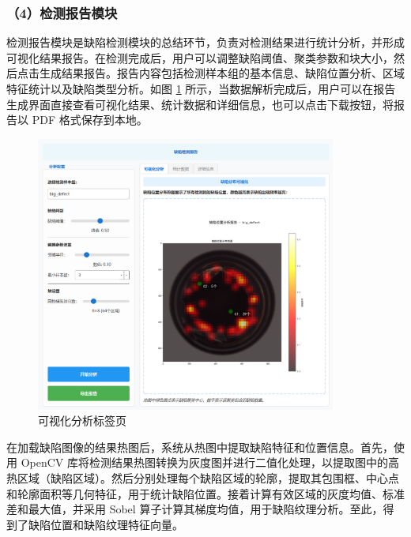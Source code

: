 \documentclass[
  ]{njuthesis}
\begin{document}
\subsubsection{（4）检测报告模块}

检测报告模块是缺陷检测模块的总结环节，负责对检测结果进行统计分析，并形成可视化结果报告。在检测完成后，用户可以调整缺陷阈值、聚类参数和块大小，然后点击生成结果报告。报告内容包括检测样本组的基本信息、缺陷位置分析、区域特征统计以及缺陷类型分析。如图 \ref{可视化分析标签页} 所示，当数据解析完成后，用户可以在报告生成界面直接查看可视化结果、统计数据和详细信息，也可以点击下载按钮，将报告以 PDF 格式保存到本地。

\begin{figure}[htb]
    \centering
    \includegraphics[width=0.88\textwidth]{images/可视化分析标签页.png}
    \caption{可视化分析标签页}
    \label{可视化分析标签页}
\end{figure}


在加载缺陷图像的结果热图后，系统从热图中提取缺陷特征和位置信息。首先，使用 OpenCV 库将检测结果热图转换为灰度图并进行二值化处理，以提取图中的高热区域（缺陷区域）。然后分别处理每个缺陷区域的轮廓，提取其包围框、中心点和轮廓面积等几何特征，用于统计缺陷位置。接着计算有效区域的灰度均值、标准差和最大值，并采用 Sobel 算子计算其梯度均值，用于缺陷纹理分析。至此，得到了缺陷位置和缺陷纹理特征向量。
\end{document}
